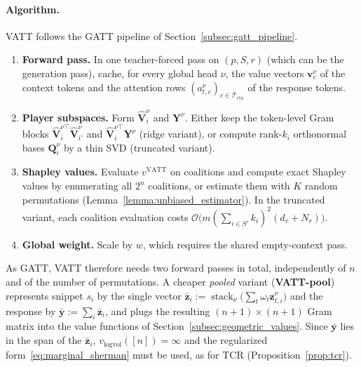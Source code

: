 \documentclass{article}
\begin{document}
\paragraph{Algorithm.}
VATT follows the GATT pipeline of Section~\ref{subsec:gatt_pipeline}.
\begin{enumerate}
    \item \textbf{Forward pass.} In one teacher-forced pass on $(p, S, r)$ (which can be the generation pass), cache, for every global head $\nu$, the value vectors $\mathbf{v}^\nu_c$ of the context tokens and the attention rows $(a^\nu_{t,c})_{c \in \mathcal{T}_{\text{ctx}}}$ of the response tokens.
    \item \textbf{Player subspaces.} Form $\hat{\mathbf{V}}^\nu_i$ and $\mathbf{Y}^\nu$. Either keep the token-level Gram blocks $\hat{\mathbf{V}}^{\nu\top}_i \hat{\mathbf{V}}^\nu_{i'}$ and $\hat{\mathbf{V}}^{\nu\top}_i \mathbf{Y}^\nu$ (ridge variant), or compute rank-$k_i$ orthonormal bases $\mathbf{Q}^\nu_i$ by a thin SVD (truncated variant).
    \item \textbf{Shapley values.} Evaluate $v^{\text{VATT}}$ on coalitions and compute exact Shapley values by enumerating all $2^n$ coalitions, or estimate them with $K$ random permutations (Lemma~\ref{lemma:unbiased_estimator}). In the truncated variant, each coalition evaluation costs $\mathcal{O}\big(m (\sum_{i \in S'} k_i)^2 (d_v + N_r)\big)$.
    \item \textbf{Global weight.} Scale by $w$, which requires the shared empty-context pass.
\end{enumerate}
As GATT, VATT therefore needs two forward passes in total, independently of $n$ and of the number of permutations. A cheaper \emph{pooled} variant (\textbf{VATT-pool}) represents snippet $s_i$ by the single vector $\bar{\mathbf{z}}_i := \operatorname{stack}_{\nu}\big(\sum_t \omega_t \mathbf{z}^\nu_{t,i}\big)$ and the response by $\bar{\mathbf{y}} := \sum_i \bar{\mathbf{z}}_i$, and plugs the resulting $(n+1) \times (n+1)$ Gram matrix into the value functions of Section~\ref{subsec:geometric_values}. Since $\bar{\mathbf{y}}$ lies in the span of the $\bar{\mathbf{z}}_i$, $v_{\text{logvol}}([n]) = \infty$ and the regularized form~\eqref{eq:marginal_sherman} must be used, as for TCR (Proposition~\ref{prop:tcr}).
\end{document}
